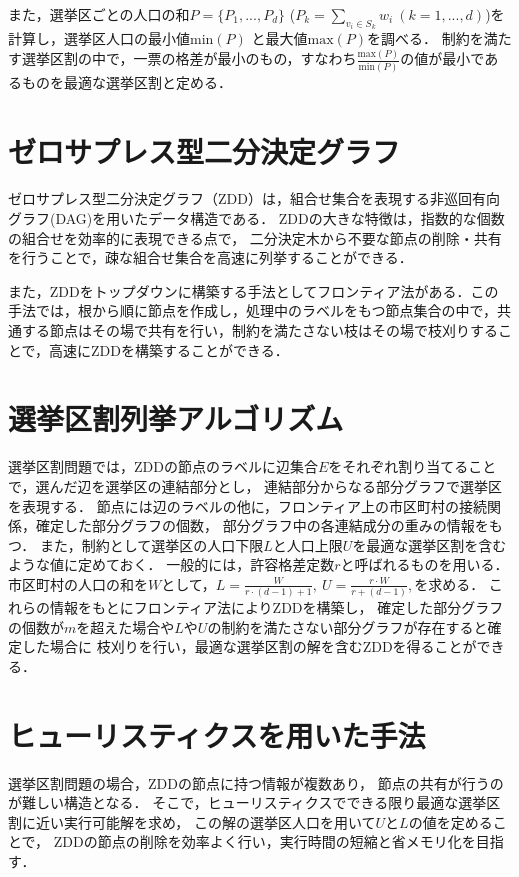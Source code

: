 \documentclass[10pt,a4paper,notitlepage,oneside,twocolumn]{abst_jsarticle}
\begin{document}
また，選挙区ごとの人口の和$P=\{P_1,...,P_d\}$ ($P_k=\sum_{v_i\in S_k}w_i\ (k=1,...,d)$)を計算し，選挙区人口の最小値$\mathrm{min}(P)$ と最大値$\mathrm{max}(P)$を調べる．
制約を満たす選挙区割の中で，一票の格差が最小のもの，すなわち$\frac{\mathrm{max}(P)}{\mathrm{min}(P)}$の値が最小であるものを最適な選挙区割と定める．

\section{ゼロサプレス型二分決定グラフ} \label{sec:section3}
ゼロサプレス型二分決定グラフ（ZDD）\cite{minato}は，組合せ集合を表現する非巡回有向グラフ(DAG)を用いたデータ構造である．
ZDDの大きな特徴は，指数的な個数の組合せを効率的に表現できる点で，
二分決定木から不要な節点の削除・共有を行うことで，疎な組合せ集合を高速に列挙することができる．

また，ZDDをトップダウンに構築する手法としてフロンティア法がある．この手法では，根から順に節点を作成し，処理中のラベルをもつ節点集合の中で，共通する節点はその場で共有を行い，制約を満たさない枝はその場で枝刈りすることで，高速にZDDを構築することができる．

\section{選挙区割列挙アルゴリズム}
選挙区割問題では，ZDDの節点のラベルに辺集合$E$をそれぞれ割り当てることで，選んだ辺を選挙区の連結部分とし，
連結部分からなる部分グラフで選挙区を表現する．
節点には辺のラベルの他に，フロンティア上の市区町村の接続関係，確定した部分グラフの個数，
部分グラフ中の各連結成分の重みの情報をもつ．
また，制約として選挙区の人口下限$L$と人口上限$U$を最適な選挙区割を含むような値に定めておく．
一般的には，許容格差定数$r$と呼ばれるものを用いる．
市区町村の人口の和を$W$として，$L=\frac{W}{r \cdot (d-1)+1}, \ U=\frac{r \cdot W}{r+(d-1)}, $を求める．
これらの情報をもとにフロンティア法によりZDDを構築し，
確定した部分グラフの個数が$m$を超えた場合や$L$や$U$の制約を満たさない部分グラフが存在すると確定した場合に
枝刈りを行い，最適な選挙区割の解を含むZDDを得ることができる．

\section{ヒューリスティクスを用いた手法}
選挙区割問題の場合，ZDDの節点に持つ情報が複数あり，
節点の共有が行うのが難しい構造となる．
そこで，ヒューリスティクスでできる限り最適な選挙区割に近い実行可能解を求め，
この解の選挙区人口を用いて$U$と$L$の値を定めることで，
ZDDの節点の削除を効率よく行い，実行時間の短縮と省メモリ化を目指す．
\end{document}
